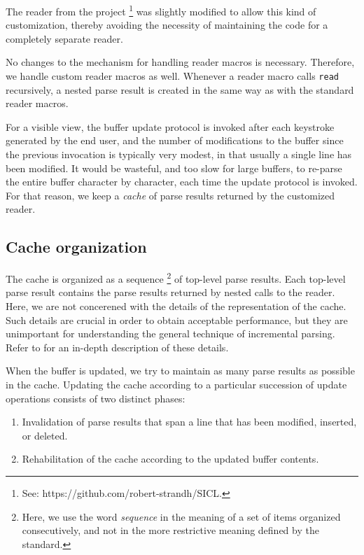 The reader from the \sicl{} project%
\footnote{See: https://github.com/robert-strandh/SICL.}  was slightly
modified to allow this kind of customization, thereby avoiding the
necessity of maintaining the code for a completely separate reader.

No changes to the mechanism for handling reader macros is necessary.
Therefore, we handle custom reader macros as well.  Whenever a reader
macro calls \texttt{read} recursively, a nested parse result is
created in the same way as with the standard reader macros.

For a visible view, the buffer update protocol is invoked after each
keystroke generated by the end user, and the number of modifications
to the buffer since the previous invocation is typically very modest,
in that usually a single line has been modified.  It would be
wasteful, and too slow for large buffers, to re-parse the entire
buffer character by character, each time the update protocol is
invoked.  For that reason, we keep a \emph{cache} of parse results
returned by the customized reader.

\subsection{Cache organization}

The cache is organized as a sequence%
\footnote{Here, we use the word \emph{sequence} in the meaning of a
  set of items organized consecutively, and not in the more
  restrictive meaning defined by the \commonlisp{} standard.}  of
top-level parse results.  Each top-level parse result contains the
parse results returned by nested calls to the reader.  Here, we are
not concerened with the details of the representation of the cache.
Such details are crucial in order to obtain acceptable performance,
but they are unimportant for understanding the general technique of
incremental parsing.  Refer to  for an
in-depth description of these details.

When the buffer is updated, we try to maintain as many parse results
as possible in the cache.  Updating the cache according to a
particular succession of update operations consists of two distinct
phases:

\begin{enumerate}
\item Invalidation of parse results that span a line that has been
  modified, inserted, or deleted.
\item Rehabilitation of the cache according to the updated buffer
  contents.
\end{enumerate}


